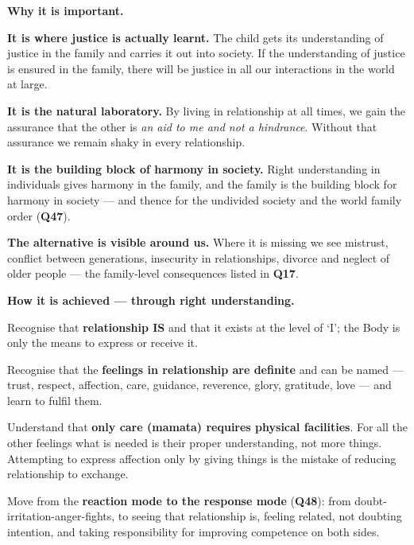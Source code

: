 \textbf{Why it is important.}

\begin{apts}
\item \textbf{It is where justice is actually learnt.} The child gets its
      understanding of justice in the family and carries it out into society.
      If the understanding of justice is ensured in the family, there will be
      justice in all our interactions in the world at large.
\item \textbf{It is the natural laboratory.} By living in relationship at all
      times, we gain the assurance that the other is \emph{an aid to me and
      not a hindrance}. Without that assurance we remain shaky in every
      relationship.
\item \textbf{It is the building block of harmony in society.} Right
      understanding in individuals gives harmony in the family, and the family
      is the building block for harmony in society --- and thence for the
      undivided society and the world family order (\textbf{Q47}).
\item \textbf{The alternative is visible around us.} Where it is missing we
      see mistrust, conflict between generations, insecurity in relationships,
      divorce and neglect of older people --- the family-level consequences
      listed in \textbf{Q17}.
\end{apts}

\textbf{How it is achieved --- through right understanding.}

\begin{abul}
\item Recognise that \textbf{relationship IS} and that it exists at the level
      of `I'; the Body is only the means to express or receive it.
\item Recognise that the \textbf{feelings in relationship are definite} and
      can be named --- trust, respect, affection, care, guidance, reverence,
      glory, gratitude, love --- and learn to fulfil them.
\item Understand that \textbf{only care (mamata) requires physical
      facilities}. For all the other feelings what is needed is their proper
      understanding, not more things. Attempting to express affection only by
      giving things is the mistake of reducing relationship to exchange.
\item Move from the \textbf{reaction mode to the response mode}
      (\textbf{Q48}): from doubt-irritation-anger-fights, to seeing that
      relationship is, feeling related, not doubting intention, and taking
      responsibility for improving competence on both sides.
\end{abul}


